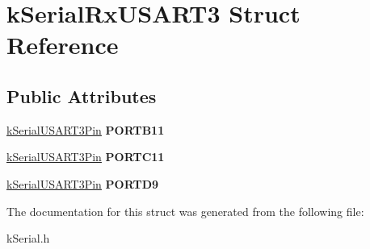 \hypertarget{structkSerialRxUSART3}{}\section{k\+Serial\+Rx\+U\+S\+A\+R\+T3 Struct Reference}
\label{structkSerialRxUSART3}
\subsection*{Public Attributes}
\begin{DoxyCompactItemize}
\item 
\hyperlink{structkSerialUSART3Pin}{k\+Serial\+U\+S\+A\+R\+T3\+Pin} {\bfseries P\+O\+R\+T\+B11}\hypertarget{structkSerialRxUSART3_aa197bd3ba586bab5f2571b5ab19745fd}{}\label{structkSerialRxUSART3_aa197bd3ba586bab5f2571b5ab19745fd}

\item 
\hyperlink{structkSerialUSART3Pin}{k\+Serial\+U\+S\+A\+R\+T3\+Pin} {\bfseries P\+O\+R\+T\+C11}\hypertarget{structkSerialRxUSART3_a07de7445b4e5a053cf82220d70b25048}{}\label{structkSerialRxUSART3_a07de7445b4e5a053cf82220d70b25048}

\item 
\hyperlink{structkSerialUSART3Pin}{k\+Serial\+U\+S\+A\+R\+T3\+Pin} {\bfseries P\+O\+R\+T\+D9}\hypertarget{structkSerialRxUSART3_ae2fc759f095c2ab9b58c6134050f883a}{}\label{structkSerialRxUSART3_ae2fc759f095c2ab9b58c6134050f883a}

\end{DoxyCompactItemize}


The documentation for this struct was generated from the following file\+:\begin{DoxyCompactItemize}
\item 
k\+Serial.\+h\end{DoxyCompactItemize}
